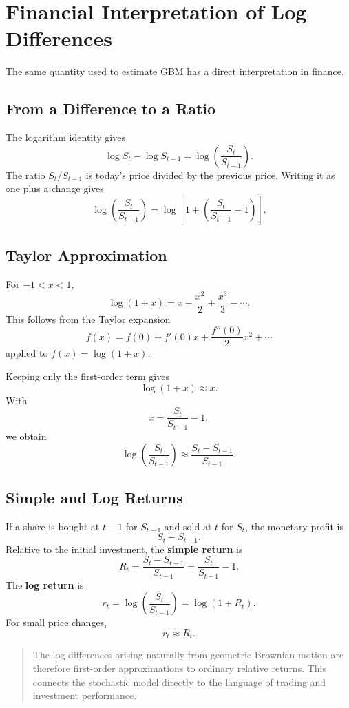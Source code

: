 \documentclass[12pt,openany]{book}
\theoremstyle{definition}
\theoremstyle{remark}
\begin{document}
\section{Financial Interpretation of Log Differences}

The same quantity used to estimate GBM has a direct interpretation in
finance.

\subsection{From a Difference to a Ratio}

The logarithm identity gives
\[
\boxed{
\log S_t-\log S_{t-1}
=\log\!\left(\frac{S_t}{S_{t-1}}\right).
}
\]
The ratio \(S_t/S_{t-1}\) is today's price divided by the previous price.
Writing it as one plus a change gives
\[
\log\!\left(\frac{S_t}{S_{t-1}}\right)
=\log\!\left[
1+\left(\frac{S_t}{S_{t-1}}-1\right)
\right].
\]

\subsection{Taylor Approximation}

For \(-1<x<1\),
\[
\log(1+x)
=x-\frac{x^2}{2}+\frac{x^3}{3}-\cdots.
\]
This follows from the Taylor expansion
\[
f(x)
=f(0)+f'(0)x+\frac{f''(0)}{2}x^2+\cdots
\]
applied to \(f(x)=\log(1+x)\).

Keeping only the first-order term gives
\[
\log(1+x)\approx x.
\]
With
\[
x=\frac{S_t}{S_{t-1}}-1,
\]
we obtain
\[
\boxed{
\log\!\left(\frac{S_t}{S_{t-1}}\right)
\approx
\frac{S_t-S_{t-1}}{S_{t-1}}.
}
\]

\subsection{Simple and Log Returns}

If a share is bought at \(t-1\) for \(S_{t-1}\) and sold at \(t\) for
\(S_t\), the monetary profit is
\[
S_t-S_{t-1}.
\]
Relative to the initial investment, the \textbf{simple return} is
\[
\boxed{
R_t
=\frac{S_t-S_{t-1}}{S_{t-1}}
=\frac{S_t}{S_{t-1}}-1.
}
\]
The \textbf{log return} is
\[
\boxed{
r_t
=\log\!\left(\frac{S_t}{S_{t-1}}\right)
=\log(1+R_t).
}
\]
For small price changes,
\[
r_t\approx R_t.
\]

\begin{quote}
The log differences arising naturally from geometric Brownian motion are
therefore first-order approximations to ordinary relative returns. This
connects the stochastic model directly to the language of trading and
investment performance.
\end{quote}
\end{document}
